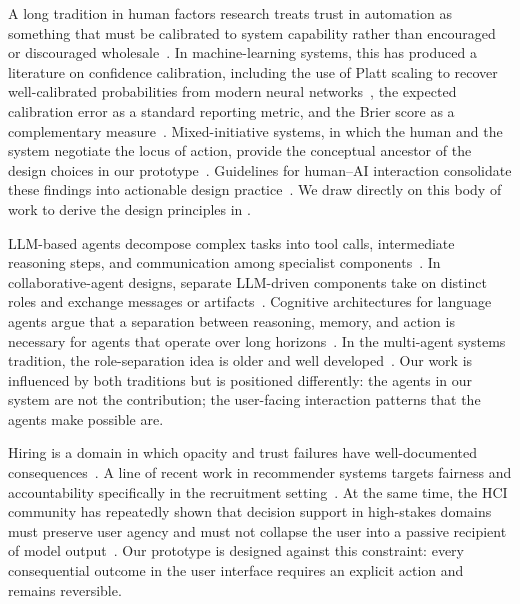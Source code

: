 A long tradition in human factors research treats trust in automation as something that must be calibrated to system capability rather than encouraged or discouraged wholesale~\cite{lee2004trust,parasuraman1997humans}.
In machine-learning systems, this has produced a literature on confidence calibration, including the use of Platt scaling to recover well-calibrated probabilities from modern neural networks~\cite{platt1999probabilistic,guo2017calibration}, the expected calibration error as a standard reporting metric, and the Brier score as a complementary measure~\cite{brier1950verification}.
Mixed-initiative systems, in which the human and the system negotiate the locus of action, provide the conceptual ancestor of the design choices in our prototype~\cite{horvitz1999principles,amershi2014power,kulesza2015principles}.
Guidelines for human--{AI} interaction consolidate these findings into actionable design practice~\cite{amershi2019guidelines,shneiderman2020human,horvitz2019ai}.
We draw directly on this body of work to derive the design principles in .

LLM-based agents decompose complex tasks into tool calls, intermediate reasoning steps, and communication among specialist components~\cite{wei2022chain,yao2023react,schick2023toolformer,xi2023rise}.
In collaborative-agent designs, separate LLM-driven components take on distinct roles and exchange messages or artifacts~\cite{li2023camel,qian2023communicative,shen2023hugginggpt}.
Cognitive architectures for language agents argue that a separation between reasoning, memory, and action is necessary for agents that operate over long horizons~\cite{sumers2024cognitive}.
In the multi-agent systems tradition, the role-separation idea is older and well developed~\cite{wooldridge2009introduction,rosenfeld2019HAS}.
Our work is influenced by both traditions but is positioned differently: the agents in our system are not the contribution; the user-facing interaction patterns that the agents make possible are.

Hiring is a domain in which opacity and trust failures have well-documented consequences~\cite{raub2018bots,ajunwa2021paradox}.
A line of recent work in recommender systems targets fairness and accountability specifically in the recruitment setting~\cite{chen2023causal}.
At the same time, the {HCI} community has repeatedly shown that decision support in high-stakes domains must preserve user agency and must not collapse the user into a passive recipient of model output~\cite{wang2019designing,ehsan2021algorithmic,joshi2021real}.
Our prototype is designed against this constraint: every consequential outcome in the user interface requires an explicit action and remains reversible.

